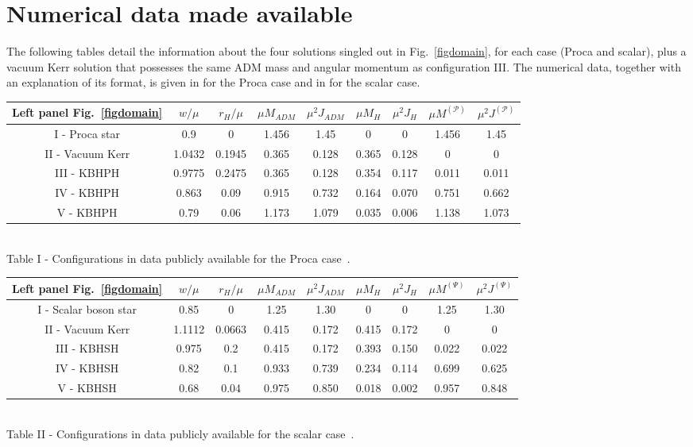 \chapter{Numerical data made available}
\label{appendixd}
The following tables detail the information about the four solutions singled out in Fig.~\ref{figdomain}, for each case (Proca and scalar), plus a vacuum Kerr solution that possesses the same ADM mass and angular momentum as configuration III. The numerical data, together with an explanation of its format, is given in  \cite{datakbhph} for the Proca case and in \cite{datakbhsh} for the scalar case.

\bigskip

\begin{center}
\begin{tabular}{|c||c|c|c|c|c|c|c|c|}
\hline
Left panel Fig.~\ref{figdomain} & $w/\mu$  & $r_H/\mu$ & $\mu M_{ADM}$ & $\mu^2J_{ADM}$ & $\mu M_{H}$ & $\mu^2J_{H}$ & $\mu M^{(\mathcal{P})}$ & $\mu^2J^{(\mathcal{P})}$   \\ \hline\hline
I - Proca star  & 0.9 & 0 & 1.456 & 1.45 & 0 & 0 & 1.456 & 1.45 
\\ \hline
II - Vacuum Kerr  & 1.0432 & 0.1945 & 0.365 & 0.128 & 0.365 & 0.128 & 0 & 0
\\ \hline
III - KBHPH & 0.9775 & 0.2475 & 0.365 & 0.128 & 0.354 & 0.117 & 0.011 & 0.011
\\ \hline
IV - KBHPH & 0.863& 0.09 & 0.915 & 0.732 & 0.164 & 0.070 & 0.751 & 0.662
\\ \hline
V - KBHPH & 0.79& 0.06 & 1.173 & 1.079 & 0.035 & 0.006 & 1.138 & 1.073
\\ \hline 
\end{tabular}\\ \bigskip
Table I - Configurations in data publicly available for the Proca case~\cite{datakbhph}.
\end{center}

\bigskip

\begin{center}
\begin{tabular}{|c||c|c|c|c|c|c|c|c|}
\hline
Left panel Fig.~\ref{figdomain} & $w/\mu$  & $r_H/\mu$ & $\mu M_{ADM}$ & $\mu^2J_{ADM}$ & $\mu M_{H}$ & $\mu^2J_{H}$ & $\mu M^{(\Psi)}$ & $\mu^2J^{(\Psi)}$   \\ \hline\hline
I - Scalar boson star  & 0.85 & 0 & 1.25 & 1.30 & 0 & 0 & 1.25 & 1.30 
\\ \hline
II - Vacuum Kerr  & 1.1112 & 0.0663 & 0.415 & 0.172 & 0.415 & 0.172 & 0 & 0
\\ \hline
III - KBHSH & 0.975 & 0.2 & 0.415 & 0.172 & 0.393 & 0.150 & 0.022 & 0.022
\\ \hline
IV - KBHSH & 0.82& 0.1 & 0.933 & 0.739 & 0.234 & 0.114 & 0.699 & 0.625
\\ \hline
V - KBHSH & 0.68& 0.04 & 0.975 & 0.850 & 0.018 & 0.002 & 0.957 & 0.848
\\ \hline 
\end{tabular}\\ \bigskip
Table II - Configurations in data publicly available for the scalar case~\cite{datakbhsh}.
\end{center}
